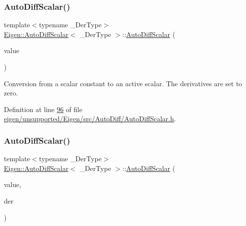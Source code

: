 \subsubsection{\texorpdfstring{Auto\+Diff\+Scalar()}{AutoDiffScalar()}\hspace{0.1cm}{\footnotesize\ttfamily [3/8]}}
{\footnotesize\ttfamily template$<$typename \+\_\+\+Der\+Type$>$ \\
\hyperlink{class_eigen_1_1_auto_diff_scalar}{Eigen\+::\+Auto\+Diff\+Scalar}$<$ \+\_\+\+Der\+Type $>$\+::\hyperlink{class_eigen_1_1_auto_diff_scalar}{Auto\+Diff\+Scalar} (\begin{DoxyParamCaption}\item[{const Real \&}]{value }\end{DoxyParamCaption})\hspace{0.3cm}{\ttfamily [inline]}}

Conversion from a scalar constant to an active scalar. The derivatives are set to zero. 

Definition at line \hyperlink{eigen_2unsupported_2_eigen_2src_2_auto_diff_2_auto_diff_scalar_8h_source_l00096}{96} of file \hyperlink{eigen_2unsupported_2_eigen_2src_2_auto_diff_2_auto_diff_scalar_8h_source}{eigen/unsupported/\+Eigen/src/\+Auto\+Diff/\+Auto\+Diff\+Scalar.\+h}.

\mbox{\label{class_eigen_1_1_auto_diff_scalar_a09641114cbb3b98a1132b82dff5939e3}} 
\subsubsection{\texorpdfstring{Auto\+Diff\+Scalar()}{AutoDiffScalar()}\hspace{0.1cm}{\footnotesize\ttfamily [4/8]}}
{\footnotesize\ttfamily template$<$typename \+\_\+\+Der\+Type$>$ \\
\hyperlink{class_eigen_1_1_auto_diff_scalar}{Eigen\+::\+Auto\+Diff\+Scalar}$<$ \+\_\+\+Der\+Type $>$\+::\hyperlink{class_eigen_1_1_auto_diff_scalar}{Auto\+Diff\+Scalar} (\begin{DoxyParamCaption}\item[{const Scalar \&}]{value,  }\item[{const \hyperlink{group___sparse_core___module}{Der\+Type} \&}]{der }\end{DoxyParamCaption})\hspace{0.3cm}{\ttfamily [inline]}}

